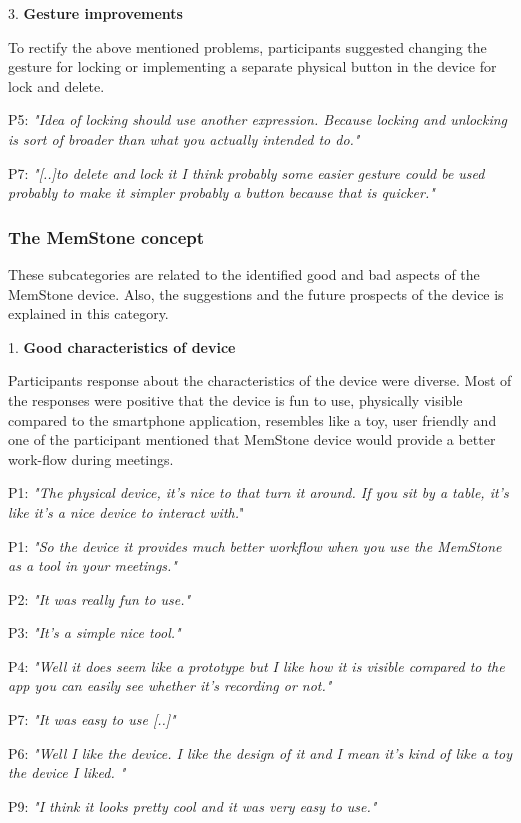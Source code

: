\documentclass[mscthesis]{usiinfthesis}
\begin{document}
3. \textbf{Gesture improvements}

To rectify the above mentioned problems, participants suggested changing the gesture for locking or implementing a separate physical button in the device for lock and delete.
\newline
\hspace{\parindent}\begin{adjustwidth}{1cm}{1cm}
\hspace{\parindent}P5: \textit{"Idea of locking should use another expression. Because locking and unlocking is sort of broader than what you actually intended to do."}

P7: \textit{"[..]to delete and lock it I think probably some easier gesture could be used probably to make it simpler probably a button because that is quicker."}
\newline
\end{adjustwidth}

\subsubsection*{The MemStone concept}
These subcategories are related to the identified good and bad aspects of the MemStone device. Also, the suggestions and the future prospects of the device is explained in this category.
\newline

1. \textbf{Good characteristics of device}

Participants response about the characteristics of the device were diverse. Most of the responses were positive that the device is fun to use, physically visible compared to the smartphone application, resembles like a toy, user friendly and one of the participant mentioned that MemStone device would provide a better work-flow during meetings.   
\newline
\hspace{\parindent}\begin{adjustwidth}{1cm}{1cm}
\hspace{\parindent}P1: \textit{"The physical device, it's nice to that turn it around. If you sit by a table, it's like it's a nice device to interact with.}"

P1: \textit{"So the device it provides much better workflow when you use the MemStone as a tool in your meetings."}

P2: \textit{"It was really fun to use."}

P3: \textit{"It's a simple nice tool."}

P4: \textit{"Well it does seem like a prototype but I like how it is visible compared to the app you can easily see whether it's recording or not."}

P7: \textit{"It was easy to use [..]"}

P6: \textit{"Well I like the device. I like the design of it and I mean it's kind of like a toy the device I liked. "}

P9: \textit{"I think it looks pretty cool and it was very easy to use."}
\newline
\end{adjustwidth}
\end{document}
